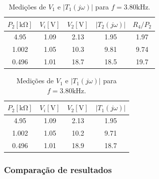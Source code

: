 \begin{table}[ht]
    \centering
    \caption{Valores experimentais da variação do valor de $P_2$.}
    \begin{subtable}[h]{0.45\textwidth}
        \centering
        \caption{Medições de $V_2$ e $\left |T_2 (j \omega) \right|$ para $f = 100 \si{\hertz}$.}
        \label{tab:influencia_P2_TT_V2}
        \begin{tabular}{ccccc}
            \hline
            $P_2 [\si{\kilo \ohm}]$ & $V_i [\si{\volt}]$ & $V_2 [\si{\volt}]$ & $\left |T_2 (j \omega) \right|$ & $R_4/P_2$ \\
            \hline
            4.95    & 1.09  & 2.13  & 1.95 & 1.97 \vspace{0.2cm}\\
            1.002   & 1.05  & 10.3  & 9.81 & 9.74  \vspace{0.2cm}\\
            0.496   & 1.01  & 18.7  & 18.5 & 19.7  \vspace{0.2cm}\\
            \hline
        \end{tabular}
    \end{subtable}
    \hfill
    \begin{subtable}[h]{0.45\textwidth}
        \centering
        \caption{Medições de $V_1$ e $\left |T_1 (j \omega) \right|$ para $f = 3.80 \si{\kilo \hertz}$.}
        \label{tab:influencia_P2_TT_V1}
        \begin{tabular}{cccc}
            \hline
            $P_2 [\si{\kilo \ohm}]$ & $V_i [\si{\volt}]$ & $V_2 [\si{\volt}]$ & $\left |T_1 (j \omega) \right|$ \\
            \hline
            4.95    & 1.09  & 2.13  & 1.95   \vspace{0.2cm}\\
            1.002   & 1.05  & 10.2  & 9.71   \vspace{0.2cm}\\
            0.496   & 1.01  & 18.9  & 18.7   \vspace{0.2cm}\\
            \hline
        \end{tabular}
    \end{subtable}
\end{table}

\subsubsection{Comparação de resultados}

